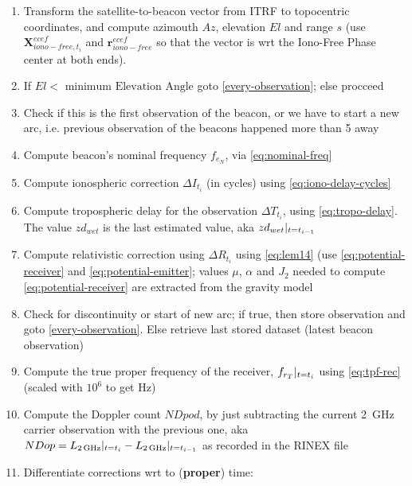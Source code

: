 \begin{enumerate}
\begin{enumerate}
\begin{enumerate}
            \item \label{cmp-rho} Transform the satellite-to-beacon vector from ITRF to topocentric coordinates, 
              and compute azimouth $Az$, elevation $El$ and range $s$ (use $\bm{X}^{ecef}_{iono-free,t_i}$ and 
              $\bm{r}^{ecef}_{iono-free}$ so that the vector is wrt the Iono-Free 
              Phase center at both ends).
            \item If $El < \text{ minimum Elevation Angle}$ goto \ref{every-observation}; else procceed
            \item Check if this is the first observation of the beacon, or we have to start 
              a new arc, i.e. previous observation of the beacons happened more than 
              \SI{5}{\min} away
            \item Compute beacon's nominal frequency $f_{e_N}$, via \ref{eq:nominal-freq} 
            \item Compute ionospheric correction $\Delta I_{t_i}$ (in cycles) using \ref{eq:iono-delay-cycles}
            \item Compute tropospheric delay for the observation $\Delta T_{t_i}$, 
              using \ref{eq:tropo-delay}. The value $zd_{wet}$ is the last estimated 
              value, aka $zd_{wet}|_{t=t_{i-1}}$
            \item Compute relativistic correction using $\Delta R_{t_i}$ using \ref{eq:lem14}
              (use \ref{eq:potential-receiver} and \ref{eq:potential-emitter}; values 
              $\mu$, $\alpha$ and $J_2$ needed to compute \ref{eq:potential-receiver} 
              are extracted from the gravity model
            \item Check for discontinuity or start of new arc; if true, then store 
              observation and goto \ref{every-observation}. Else retrieve last 
              stored dataset (latest beacon observation)
            \item Compute the true proper frequency of the receiver, $f_{r_T}|_{t=t_i}$ 
              using \ref{eq:tpf-rec} (scaled with $10^6$ to get \si{\Hz})
            \item Compute the Doppler count $NDpod$, by just subtracting the current 
              \SI{2}{\GHz} carrier observation with the previous one, aka
              $NDop = L_{\SI{2}{\GHz}}\at{t=t_i} - L_{\SI{2}{\GHz}}\at{t=t_{i-1}}$
              as recorded in the RINEX file
            \item Differentiate corrections wrt to (\textbf{proper}) time:
              \begin{itemize}

\end{itemize}
\end{enumerate}
\end{enumerate}
\end{enumerate}
